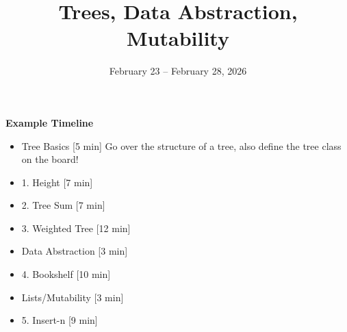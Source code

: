 \documentclass{exam}
\title{Trees, Data Abstraction, Mutability}
\date{February 23 -- February 28, 2026}
\begin{document}
\maketitle

\begin{meta}
    \textbf{Example Timeline}
    \begin{itemize}
        \item Tree Basics [5 min]
        \subitem Go over the structure of a tree, also define the tree class on the board! 
        \item 1. Height [7 min]
        \item 2. Tree Sum [7 min]
        \item 3. Weighted Tree [12 min]
        \item Data Abstraction [3 min]
        \item 4. Bookshelf [10 min] 
        \item Lists/Mutability [3 min]
        \item 5. Insert-n [9 min] 
    \end{itemize}
\end{meta} 
\end{document}
